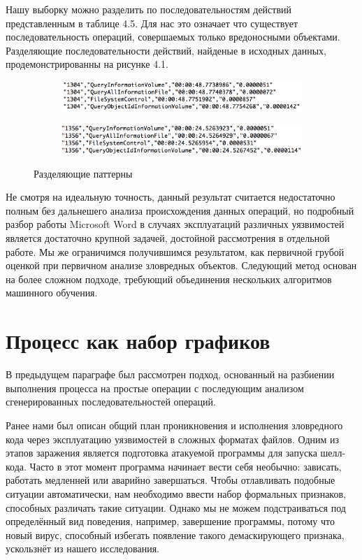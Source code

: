 Нашу выборку можно разделить по последовательностям действий представленным в таблице 4.5.
Для нас это означает что существует последовательность операций, совершаемых только вредоносными объектами.
Разделяющие последовательности действий, найденые в исходных данных, продемонстрированны на рисунке 4.1.

\begin{figure}[ht]
    \centering
    \begin{subfigure}[h]{0.6\textwidth}
    \centering
        \includegraphics[scale=0.7]{pattern_0.png}
        \caption{}
        \vspace*{5mm}
    \end{subfigure}
    \begin{subfigure}[h]{0.6\textwidth}
    \centering
        \includegraphics[scale=0.7]{pattern_1.png}
        \caption{}
    \end{subfigure}
    \caption{Разделяющие паттерны}
    \label{fig_parsetree}
\end{figure}

Не смотря на идеальную точность, данный результат считается недостаточно полным без дальнешего анализа происхождения данных операций, но подробный разбор работы Microsoft Word в случаях эксплуатаций различных уязвимостей является достаточно крупной задачей, достойной рассмотрения в отдельной работе.
Мы же ограничимся получившимся результатом, как первичной грубой оценкой при первичном анализе зловредных объектов.
Следующий метод основан на более сложном подходе, требующий объединения нескольких алгоритмов машинного обучения.

\section{Процесс как набор графиков}

В предыдущем параграфе был рассмотрен подход, основанный на разбиении выполнения процесса на простые операции с последующим анализом сгенерированных последовательностей операций.

Ранее нами был описан общий план проникновения и исполнения зловредного кода через эксплуатацию уязвимостей в сложных форматах файлов. Одним из этапов заражения является подготовка атакуемой программы для запуска шелл-кода. Часто в этот момент программа начинает вести себя необычно: зависать, работать медленней или аварийно завершаться. Чтобы отлавливать подобные ситуации автоматически, нам необходимо ввести набор формальных признаков, способных различать такие ситуации. Однако мы не можем подстраиваться под определённый вид поведения, например, завершение программы, потому что новый вирус, способный избегать появление такого демаскирующего признака, ускользнёт из нашего исследования.


